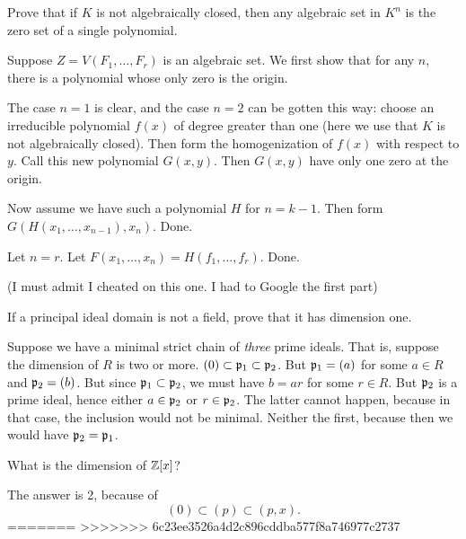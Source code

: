 \documentclass[11pt, english]{article}
\begin{document}
\begin{oppg}[Exercise 1.11]
Prove that if $K$ is not algebraically closed, then any algebraic set in $K^n$ is the zero set of a single polynomial.
\end{oppg}
\begin{losn}
Suppose $Z=V(F_1,\ldots,F_r)$ is an algebraic set. We first show that for any $n$, there is a polynomial whose only zero is the origin. 

The case $n=1$ is clear, and the case $n=2$ can be gotten this way: choose an irreducible polynomial $f(x)$ of degree greater than one (here we use that $K$ is not algebraically closed). Then form the homogenization of $f(x)$ with respect to $y$. Call this new polynomial $G(x,y)$. Then $G(x,y)$ have only one zero at the origin. 

Now assume we have such a polynomial $H$ for $n=k-1$. Then form $G(H(x_1,\ldots,x_{n-1}),x_n)$. Done.

Let $n=r$. Let $F(x_1,\ldots,x_n)=H(f_1,\ldots,f_r)$. Done.

(I must admit I cheated on this one. I had to Google the first part)
\end{losn}

\begin{oppg}[Exc 1.14]
If a principal ideal domain is not a field, prove that it has dimension one.
\end{oppg}
\begin{losn}
Suppose we have a minimal strict chain of \emph{three} prime ideals. That is, suppose the dimension of $R$ is two or more. $(0) \subset \mathfrak{p}_1 \subset \mathfrak{p}_2$. But $\mathfrak{p}_1=(a)$ for some $a \in R$ and $\mathfrak{p}_2=(b)$. But since $\mathfrak{p}_1 \subset \mathfrak{p}_2$, we must have $b=ar$ for some $r \in R$. But $\mathfrak{p}_2$ is a prime ideal, hence either $a \in \mathfrak{p}_2$ or $r \in \mathfrak{p}_2$. The latter cannot happen, because in that case, the inclusion would not be minimal. Neither the first, because then we would have $\mathfrak{p}_2 = \mathfrak{p}_1$. 
\end{losn}

\begin{exc}
What is the dimension of $\mathbb{Z}[x]$? 
\end{exc}
\begin{sol}
The answer is 2, because of
$$
(0) \subset (p) \subset (p,x).
$$
=======
>>>>>>> 6c23ee3526a4d2c896cddba577f8a746977c2737
\end{sol}
\end{document}
